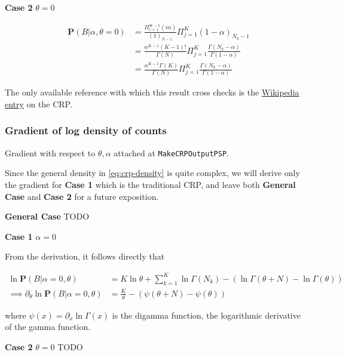 \documentclass[12pt]{article}
\begin{document}
\textbf{Case 2} $\theta = 0$

\begin{eqnarray*}
&\mathbf{P}(B|\alpha,\theta=0)
    & = \frac{\Pi_{i=1}^{K-1}(i\alpha)}{(1)_{N-1}}\Pi_{j=1}^K(1-\alpha)_{N_k-1}\\
&   & = \frac{\alpha^{K-1}(K-1)!}{\Gamma(N)}\Pi_{j=1}^K
            \frac{\Gamma(N_k-\alpha)}{\Gamma(1-\alpha)}\\
&   & = \frac{\alpha^{K-1}\Gamma(K)}{\Gamma(N)}\Pi_{j=1}^K
\frac{\Gamma(N_k-\alpha)}{\Gamma(1-\alpha)}
\end{eqnarray*}

The only available reference with which this result cross checks is the
\href{https://en.wikipedia.org/wiki/Chinese_restaurant_process#Generalization}
{Wikipedia entry} on the CRP.

\subsubsection{Gradient of log density of counts}

Gradient with respect to $\theta, \alpha$ attached at \texttt{MakeCRPOutputPSP}.

Since the general density in \eqref{eq:crp-density} is quite complex, we will derive
only the gradient for \textbf{Case 1} which is the traditional CRP,
and leave both \textbf{General Case} and \textbf{Case 2} for a
future exposition.

\textbf{General Case} TODO

\textbf{Case 1} $\alpha = 0$

From the derivation, it follows directly that

\begin{align*}
\ln\mathbf{P}(B|\alpha=0,\theta)
    & = K\ln\theta + \sum_{k=1}^{K}\ln\Gamma(N_k) -(\ln\Gamma(\theta+N)-\ln\Gamma(\theta))\\
\implies \partial_\theta\ln\mathbf{P}(B|\alpha=0,\theta)
    &= \frac{K}{\theta} - (\psi(\theta+N) - \psi(\theta))
\end{align*}

where $\psi(x) = \partial_x\ln\Gamma(x)$ is the digamma function, the logarithmic
derivative of the gamma function.

\textbf{Case 2} $\theta = 0$ TODO
\end{document}
